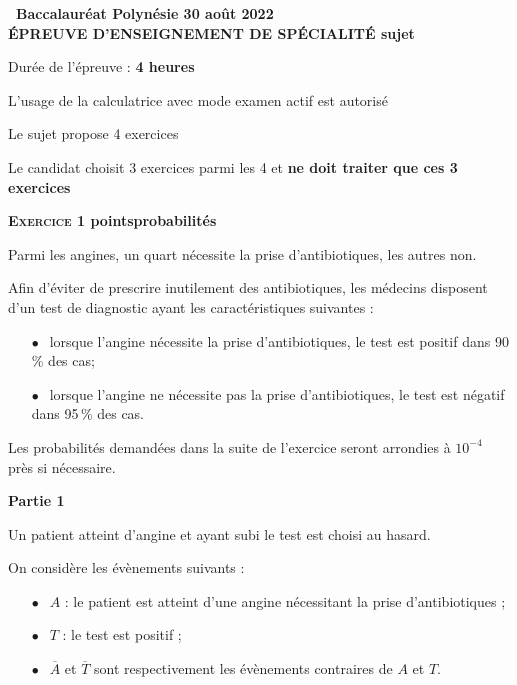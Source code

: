 \documentclass[10pt,a4paper]{article}
\begin{document}
\label{Polynesie3}

\pagestyle{fancy}
\thispagestyle{empty}

\begin{center}{\Large\textbf{\decofourleft~Baccalauréat Polynésie 30 août 2022~\decofourright\\[6pt] ÉPREUVE D'ENSEIGNEMENT DE SPÉCIALITÉ sujet }}

\bigskip

Durée de l'épreuve : \textbf{4 heures}

\medskip

L'usage de la calculatrice avec mode examen actif est autorisé

\medskip

Le sujet propose 4 exercices

Le candidat choisit 3 exercices parmi les 4 et \textbf{ne doit traiter que ces 3 exercices}
\end{center}

\bigskip

\textbf{\textsc{Exercice 1}  points\hfill probabilités}

\medskip

Parmi les angines, un quart nécessite la prise d'antibiotiques, les autres non.

Afin d'éviter de prescrire inutilement des antibiotiques, les médecins disposent d'un test de diagnostic ayant les caractéristiques suivantes :

\begin{itemize}
\item[$\bullet~~$]lorsque l'angine nécessite la prise d'antibiotiques, le test est positif dans 90\,\% des cas;
\item[$\bullet~~$]lorsque l'angine ne nécessite pas la prise d'antibiotiques, le test est négatif dans 95\,\% des cas.
\end{itemize}

\medskip

Les probabilités demandées dans la suite de l'exercice seront arrondies à $10^{-4}$ près si nécessaire.

\bigskip

\textbf{Partie 1}

\medskip

Un patient atteint d'angine et ayant subi le test est choisi au hasard. 

On considère les évènements suivants :

\begin{itemize}
\item[$\bullet~~$]$A$ : \og le patient est atteint d'une angine nécessitant la prise d'antibiotiques \fg{} ;
\item[$\bullet~~$]$T$ : \og le test est positif \fg{} ;
\item[$\bullet~~$]$\overline{A}$ et $\overline{T}$ sont respectivement les évènements contraires de $A$ et $T$.
\end{itemize}
\end{document}
